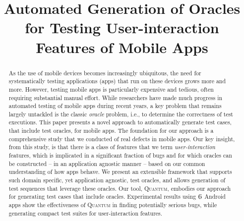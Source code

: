 \documentclass[conference, compsocconf]{IEEEtran}
\newcommand{\tool}{\textsc{Quantum}}
\newcommand{\NumApps}{\textsc{6}}
\begin{document}
\title{Automated Generation of Oracles for Testing User-interaction Features of Mobile Apps}

\author{
\and
{}
\and
{}
}

\maketitle


\begin{abstract}

As the use of mobile devices becomes increasingly ubiquitous, the need
for systematically testing applications (apps) that run on these
devices grows more and more.  However, testing mobile apps is
particularly expensive and tedious, often requiring substantial manual
effort.  While researchers have made much progress in automated
testing of mobile apps during recent years, a key problem that remains
largely untackled is the classic \emph{oracle} problem, i.e., to
determine the correctness of test executions.  This paper presents a
novel approach to automatically generate test cases, that include test oracles,
for mobile apps.
The foundation for our approach is a comprehensive study that we conducted of real defects in mobile
apps. Our key insight, from this study, is that
there is a class of features that we term \emph{user-interaction} features,
which is implicated in a significant fraction of bugs and for
which oracles can be constructed -- in an application agnostic manner --
based on our common understanding of how apps behave.  We present an extensible
framework that supports such domain specific, yet application
agnostic, test oracles, and allows generation of test sequences that
leverage these oracles.
Our tool, \tool, embodies our approach for generating test
cases that include oracles.  Experimental results using $\NumApps$ Android
apps show the effectiveness of \tool{} in finding potentially serious
bugs, while generating compact test suites for user-interaction features.

\end{abstract}
\end{document}
